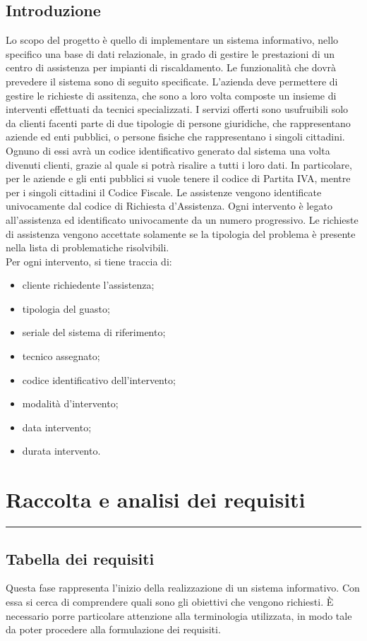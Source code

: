 \documentclass[legalpaper]{article}
\begin{document}
\subsection{Introduzione}
Lo scopo del progetto è quello di implementare un sistema informativo, nello specifico una base di dati relazionale, in grado di gestire le prestazioni di un centro di assistenza per impianti di riscaldamento. 
Le funzionalità che dovrà prevedere il sistema sono di seguito specificate.
L'azienda deve permettere di gestire le richieste di assitenza, che sono a loro volta composte un insieme di interventi effettuati da tecnici specializzati.
I servizi offerti sono usufruibili solo da clienti facenti parte di due tipologie di persone giuridiche, che rappresentano aziende ed enti pubblici, o persone fisiche che rappresentano i singoli cittadini.
Ognuno di essi avrà un codice identificativo generato dal sistema una volta divenuti clienti, grazie al quale si potrà risalire a tutti i loro dati. 
In particolare, per le aziende e gli enti pubblici si vuole tenere il codice di Partita IVA, mentre per i singoli cittadini il Codice Fiscale.
Le assistenze vengono identificate univocamente dal codice di Richiesta d'Assistenza. Ogni intervento è legato all'assistenza ed identificato univocamente da un numero progressivo. 
Le richieste di assistenza vengono accettate solamente se la tipologia del problema è presente nella lista di problematiche risolvibili. \\
Per ogni intervento, si tiene traccia di:
\medskip
\begin{itemize}
    \item cliente richiedente l'assistenza;
    \item tipologia del guasto;
    \item seriale del sistema di riferimento;
    \item tecnico assegnato;
    \item codice identificativo dell'intervento;
    \item modalità d'intervento;
    \item data intervento;
    \item durata intervento.
\end{itemize}


\newpage
\section{Raccolta e analisi dei requisiti}
\rule{\linewidth}{1.5pt}
\subsection{Tabella dei requisiti}
Questa fase rappresenta l’inizio della realizzazione di un sistema informativo. Con essa si cerca di comprendere quali sono gli obiettivi che vengono richiesti. 
È necessario porre particolare attenzione alla terminologia utilizzata, in modo tale da poter procedere alla formulazione dei requisiti.
\end{document}
